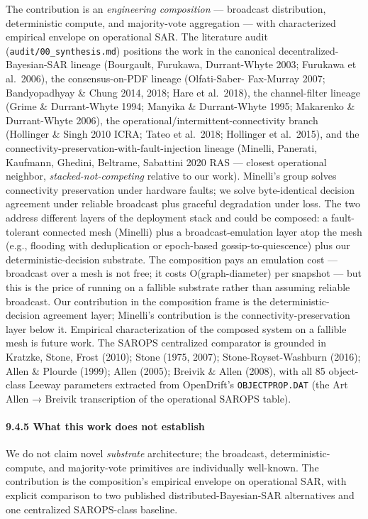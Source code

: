 The contribution is an \emph{engineering composition} --- broadcast
distribution, deterministic compute, and majority-vote aggregation ---
with characterized empirical envelope on operational SAR. The literature
audit (\texttt{audit/00\_synthesis.md}) positions the work in the
canonical decentralized-Bayesian-SAR lineage (Bourgault, Furukawa,
Durrant-Whyte 2003; Furukawa et al.~2006), the consensus-on-PDF lineage
(Olfati-Saber- Fax-Murray 2007; Bandyopadhyay \& Chung 2014, 2018; Hare
et al.~2018), the channel-filter lineage (Grime \& Durrant-Whyte 1994;
Manyika \& Durrant-Whyte 1995; Makarenko \& Durrant-Whyte 2006), the
operational/intermittent-connectivity branch (Hollinger \& Singh 2010
ICRA; Tateo et al.~2018; Hollinger et al.~2015), and the
connectivity-preservation-with-fault-injection lineage (Minelli,
Panerati, Kaufmann, Ghedini, Beltrame, Sabattini 2020 RAS --- closest
operational neighbor, \emph{stacked-not-competing} relative to our
work). Minelli's group solves connectivity preservation under hardware
faults; we solve byte-identical decision agreement under reliable
broadcast plus graceful degradation under loss. The two address
different layers of the deployment stack and could be composed: a
fault-tolerant connected mesh (Minelli) plus a broadcast-emulation layer
atop the mesh (e.g., flooding with deduplication or epoch-based
gossip-to-quiescence) plus our deterministic-decision substrate. The
composition pays an emulation cost --- broadcast over a mesh is not
free; it costs O(graph-diameter) per snapshot --- but this is the price
of running on a fallible substrate rather than assuming reliable
broadcast. Our contribution in the composition frame is the
deterministic-decision agreement layer; Minelli's contribution is the
connectivity-preservation layer below it. Empirical characterization of
the composed system on a fallible mesh is future work. The SAROPS
centralized comparator is grounded in Kratzke, Stone, Frost (2010);
Stone (1975, 2007); Stone-Royset-Washburn (2016); Allen \& Plourde
(1999); Allen (2005); Breivik \& Allen (2008), with all 85 object-class
Leeway parameters extracted from OpenDrift's \texttt{OBJECTPROP.DAT}
(the Art Allen → Breivik transcription of the operational SAROPS table).

\paragraph{9.4.5 What this work does not
establish}\label{what-this-work-does-not-establish}

We do not claim novel \emph{substrate} architecture; the broadcast,
deterministic-compute, and majority-vote primitives are individually
well-known. The contribution is the composition's empirical envelope on
operational SAR, with explicit comparison to two published
distributed-Bayesian-SAR alternatives and one centralized SAROPS-class
baseline.

